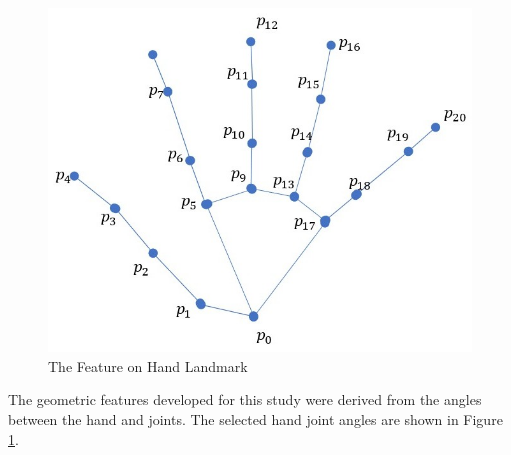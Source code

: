\begin{figure}[h]
	\centering
	\includegraphics[width=\linewidth]{img/hand_feature} 
	\caption{The Feature on Hand Landmark}
	\label{fig:hand_feature} %
\end{figure}

The geometric features developed for this study were derived from the angles between the hand and joints. The selected hand joint angles are shown in Figure \ref{fig:hand_feature}.

